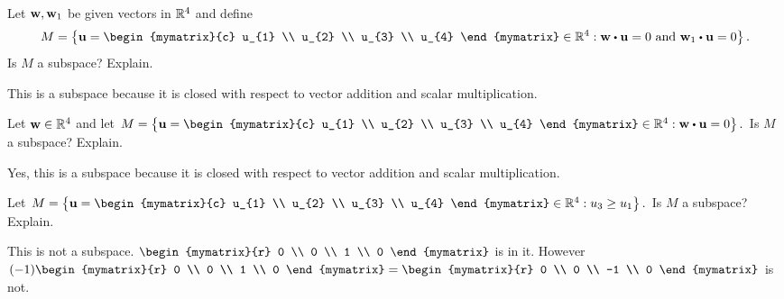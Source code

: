 \begin{enumialphparenastyle}
\begin{ex} Let ${\bf w},{\bf w}_{1}$ be given vectors in $\mathbb{R}^{4}$ and define 
\begin{equation*}
M=\set{\vect{u}=\begin{mymatrix}{c}
u_{1} \\
u_{2} \\
u_{3} \\
u_{4}
\end{mymatrix} \in \R
^{4}:\vect{w}\dotprod \vect{u}=0\text{ and }\vect{w}_{1}\dotprod \vect{u}=0}
.
\end{equation*}
Is $M$ a subspace? Explain.
\begin{sol}
This is a subspace because it is closed
with respect to vector addition and scalar multiplication.
\end{sol}
\end{ex}


\begin{ex} Let ${\bf w}\in \mathbb{R}^{4}$ and let $M=\set{\vect{u}
=\begin{mymatrix}{c}
u_{1} \\
u_{2} \\
u_{3} \\
u_{4}
\end{mymatrix} \in \R^{4}:\vect{w}\dotprod \vect{u}
=0} .$ Is $M$ a subspace? Explain.
\begin{sol}
Yes, this is a subspace because it is closed with respect to vector addition and scalar multiplication.
\end{sol}
\end{ex}

\begin{ex} Let $M=\set{\vect{u}=\begin{mymatrix}{c}
u_{1} \\
u_{2} \\
u_{3} \\
u_{4}
\end{mymatrix} \in 
\R^{4}:u_{3}\geq u_{1}} .$ Is $M$ a subspace? Explain.
\begin{sol}
This
is not a subspace. $\begin{mymatrix}{r}
0 \\
0 \\
1 \\
0
\end{mymatrix} $ is in it. However $(-1) \begin{mymatrix}{r}
0 \\
0 \\
1 \\
0
\end{mymatrix}  = \begin{mymatrix}{r}
0 \\
0 \\
-1 \\
0
\end{mymatrix} $ is not.
\end{sol}
\end{ex}


\end{enumialphparenastyle}
